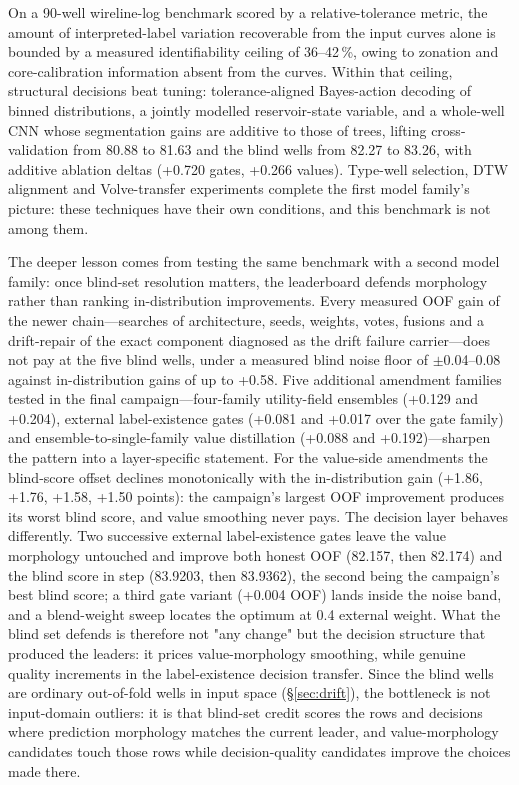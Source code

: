 \documentclass[preprint,12pt]{elsarticle}
\begin{document}
On a 90-well wireline-log benchmark scored by a relative-tolerance metric, the amount of interpreted-label variation recoverable from the input curves alone is bounded by a measured identifiability ceiling of 36--42\,\%, owing to zonation and core-calibration information absent from the curves. Within that ceiling, structural decisions beat tuning: tolerance-aligned Bayes-action decoding of binned distributions, a jointly modelled reservoir-state variable, and a whole-well CNN whose segmentation gains are additive to those of trees, lifting cross-validation from 80.88 to 81.63 and the blind wells from 82.27 to 83.26, with additive ablation deltas (+0.720 gates, +0.266 values). Type-well selection, DTW alignment and Volve-transfer experiments complete the first model family's picture: these techniques have their own conditions, and this benchmark is not among them.

The deeper lesson comes from testing the same benchmark with a second model family: once blind-set resolution matters, the leaderboard defends morphology rather than ranking in-distribution improvements. Every measured OOF gain of the newer chain---searches of architecture, seeds, weights, votes, fusions and a drift-repair of the exact component diagnosed as the drift failure carrier---does not pay at the five blind wells, under a measured blind noise floor of $\pm$0.04--0.08 against in-distribution gains of up to +0.58. Five additional amendment families tested in the final campaign---four-family utility-field ensembles (+0.129 and +0.204), external label-existence gates (+0.081 and +0.017 over the gate family) and ensemble-to-single-family value distillation (+0.088 and +0.192)---sharpen the pattern into a layer-specific statement. For the value-side amendments the blind-score offset declines monotonically with the in-distribution gain (+1.86, +1.76, +1.58, +1.50 points): the campaign's largest OOF improvement produces its worst blind score, and value smoothing never pays. The decision layer behaves differently. Two successive external label-existence gates leave the value morphology untouched and improve both honest OOF (82.157, then 82.174) and the blind score in step (83.9203, then 83.9362), the second being the campaign's best blind score; a third gate variant (+0.004 OOF) lands inside the noise band, and a blend-weight sweep locates the optimum at 0.4 external weight. What the blind set defends is therefore not "any change" but the decision structure that produced the leaders: it prices value-morphology smoothing, while genuine quality increments in the label-existence decision transfer. Since the blind wells are ordinary out-of-fold wells in input space (§\ref{sec:drift}), the bottleneck is not input-domain outliers: it is that blind-set credit scores the rows and decisions where prediction morphology matches the current leader, and value-morphology candidates touch those rows while decision-quality candidates improve the choices made there.
\end{document}
